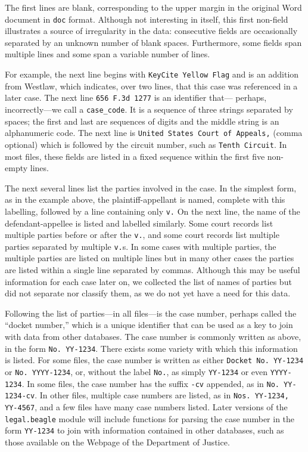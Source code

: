 \documentclass[11pt]{paper}
\begin{document}
The first lines are blank, corresponding to the upper margin in the original 
Word document in \texttt{doc} format.  
Although not interesting in itself, this first non-field illustrates a source 
of irregularity in the data: consecutive fields are occasionally separated 
by an unknown number of blank spaces. 
Furthermore, some fields span multiple lines and some span a variable number 
of lines. 

For example, the next line begins with \texttt{KeyCite Yellow Flag} and is an 
addition from Westlaw, which indicates, over two lines, that this case was 
referenced in a later case. 
The next line \texttt{656 F.3d 1277} is an identifier that---%
perhaps, incorrectly---we call a \texttt{case\_code}. 
It is a sequence of three strings separated by spaces; the first and last are 
sequences of digits and the middle string is an alphanumeric code. 
The next line is \texttt{United States Court of Appeals,} (comma optional) 
which is followed by the circuit number, such as \texttt{Tenth Circuit}. 
In most files, these fields are listed in a fixed sequence within the first 
five non-empty lines. 

The next several lines list the parties involved in the case. 
In the simplest form, as in the example above, the plaintiff-appellant is 
named, complete with this labelling, followed by a line containing only 
\texttt{v.}
On the next line, the name of the defendant-appellee is listed and labelled 
similarly. 
Some court records list multiple parties before or after the \texttt{v.}, and 
some court records list multiple parties separated by multiple \texttt{v.}s. 
In some cases with multiple parties, the multiple parties are listed on
multiple lines but in many other cases the parties are listed within a 
single line separated by commas. 
Although this may be useful information for each case later on, we collected 
the list of names of parties but did not separate nor classify them, as we 
do not yet have a need for this data.

Following the list of parties---in all files---is the case number, perhaps 
called the ``docket number,'' which is a unique identifier that can be used 
as a key to join with data from other databases. 
The case number is commonly written as above, in the form \texttt{No. YY-1234}. 
There exists some variety with which this information is listed. 
For some files, the case number is written as either \texttt{Docket No. YY-1234}
or \texttt{No. YYYY-1234}, or, without the label \texttt{No.}, 
as simply \texttt{YY-1234} or even \texttt{YYYY-1234}. 
In some files, the case number has the suffix \texttt{-cv} appended, as in 
\texttt{No. YY-1234-cv}. 
In other files, multiple case numbers are listed, as in 
\texttt{Nos. YY-1234, YY-4567}, and a few files have many case numbers listed. 
Later versions of the \texttt{legal.beagle} module will include functions for 
parsing the case number in the form \texttt{YY-1234} to join with information 
contained in other databases, such as those available on the Webpage of the 
Department of Justice.
\end{document}
